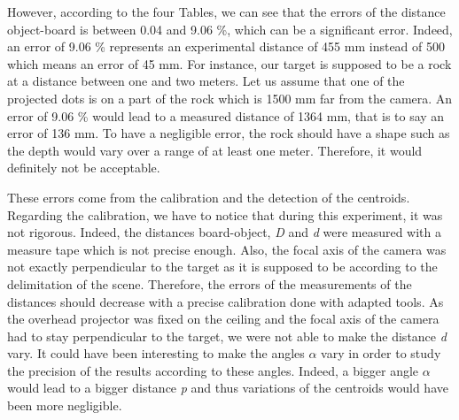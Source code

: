 However, according to the four Tables, we can see that the errors of the distance object-board is between 0.04 and 9.06 \%, which can be a significant error. Indeed, an error of 9.06 \% represents an experimental distance of 455 mm instead of 500 which means an error of 45 mm. For instance, our target is supposed to be a rock at a distance between one and two meters. Let us assume that one of the projected dots is on a part of the rock which is 1500 mm far from the camera. An error of 9.06 \% would lead to a measured distance of 1364 mm, that is to say an error of 136 mm. To have a negligible error, the rock should have a shape such as the depth would vary over a range of at least one meter. Therefore, it would definitely not be acceptable.

These errors come from the calibration and the detection of the centroids. Regarding the calibration, we have to notice that during this experiment, it was not rigorous. Indeed, the distances board-object, \emph{D} and \emph{d} were measured with a measure tape which is not precise enough. Also, the focal axis of the camera was not exactly perpendicular to the target as it is supposed to be according to the delimitation of the scene. Therefore, the errors of the measurements of the distances should decrease with a precise calibration done with adapted tools. As the overhead projector was fixed on the ceiling and the focal axis of the camera had to stay perpendicular to the target, we were not able to make the distance \emph{d} vary. It could have been interesting to make the angles $\alpha$ vary in order to study the precision of the results according to these angles. Indeed, a bigger angle $\alpha$ would lead to a bigger distance \emph{p} and thus variations of the centroids would have been more negligible.

